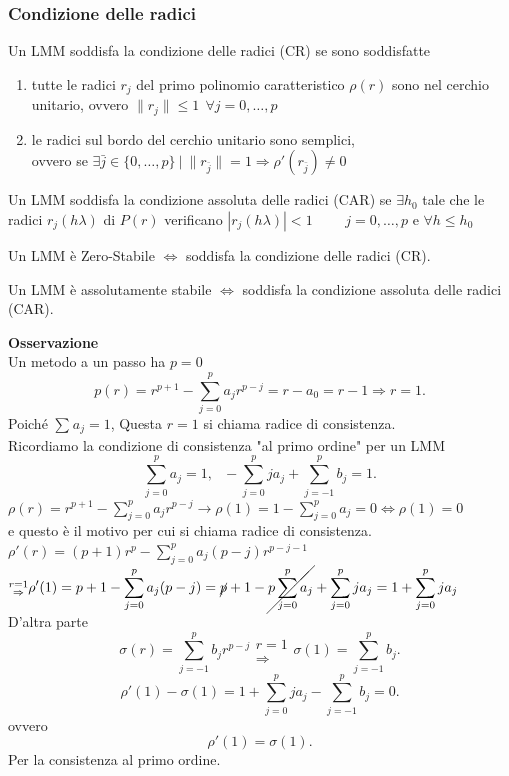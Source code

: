 \documentclass[12px]{article}
\begin{document}
\subsubsection{Condizione delle radici}
\begin{defi}
	Un LMM soddisfa la condizione delle radici (CR) se sono soddisfatte
	\begin{enumerate}
		\item tutte le radici $r_j$ del primo polinomio caratteristico $\rho(r)$ sono nel cerchio unitario, ovvero $\|r_j\|\leq 1 \ \ \forall j =0 ,\ldots, p $
		\item le radici sul bordo del cerchio unitario sono semplici, \\
			ovvero  se $\exists \bar j \in \{0,\ldots,p\} \ | \ \|r_{\bar j}\| = 1 \Rightarrow \rho'(r_{\bar j})\neq 0 $
	\end{enumerate}
\end{defi}
\begin{defi}
	Un LMM soddisfa la condizione assoluta delle radici (CAR) se $\exists h_0$  tale che le radici $r_j(h\lambda)$ di  $P(r)$ verificano  $|r_j(h\lambda)|< 1$ \ \ \ \ $j = 0,\ldots, p$ e  $\forall h\leq h_0$
\end{defi}
\begin{teo}
	Un LMM è Zero-Stabile $ \Leftrightarrow$ soddisfa la condizione delle radici (CR).
\end{teo}
\begin{teo}
	Un LMM è assolutamente stabile $ \Leftrightarrow$ soddisfa la condizione assoluta delle radici (CAR).
\end{teo}
\textbf{Osservazione}\\
Un metodo a un passo ha $p=0$
 \[
	 p(r) = r^{p+1} - \sum^{p}_{j=0}a_jr^{p-j} = r - a_0 = r - 1 \Rightarrow r = 1
.\] 
Poiché $\sum^{}_{}a_j = 1$, Questa $r = 1$ si chiama radice di consistenza.\\
Ricordiamo la condizione di consistenza  "al primo ordine" per un LMM
\[
\sum^{p}_{j=0}a_j = 1, \ \ \ - \sum^{ p }_{j=0}ja_j + \sum^{p}_{j=-1}b_j = 1
.\] 
$\rho(r) = r^{p+1} - \sum^{p}_{j=0}a_jr^{p-j} \rightarrow \rho(1) = 1 - \sum_{j=0}^{p}a_j = 0 \Leftrightarrow \rho(1) =0 $ \\ 
e questo è il motivo per cui si chiama radice di consistenza.\\
$\displaystyle\rho'(r) = (p+1)r^p - \sum^{p}_{j=0}a_j(p-j)r^{p-j-1}$\\
$\displaystyle \substack{r = 1\\ \Rightarrow }\rho'(1) = p+ 1- \sum^{p}_{j=0}a_j(p-j) = \cancel p+1-\cancel{p \sum^{p}_{j=0}a_j} +  \sum^{p}_{j=0}j a_j = 1 + \sum^{p}_{j=0}ja_j$\\
D'altra parte
\[
	\sigma(r) = \sum^{p}_{j=-1}b_jr^{p-j} \substack{r = 1\\\Rightarrow } \sigma(1) = \sum^{p}_{j=-1}b_j
.\]  
\[
\rho'(1) - \sigma(1) = 1 + \sum^{p}_{j=0}ja_j - \sum^{p}_{j=-1}b_j = 0
.\] 
ovvero \[
\rho'(1) = \sigma(1)
.\] 
Per la consistenza al primo ordine.
\end{document}

